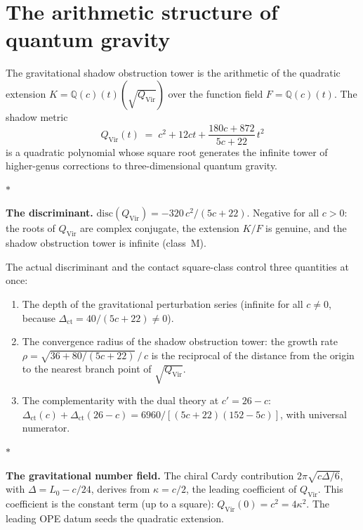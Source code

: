 \documentclass[11pt]{article}
\newcommand{\Q}{\mathbb{Q}}
\newcommand{\sep}{\bigskip\begin{center}$*$\end{center}\medskip}
\begin{document}
\section{The arithmetic structure of quantum gravity}
\label{sec:arithmetic-gravity}

The gravitational shadow obstruction tower is the arithmetic of the quadratic
extension $K = \Q(c)(t)(\sqrt{Q_{\mathrm{Vir}}})$ over the
function field $F = \Q(c)(t)$.  The shadow metric
\[
  Q_{\mathrm{Vir}}(t)
  \;=\;
  c^2 + 12ct + \frac{180c + 872}{5c + 22}\,t^2
\]
is a quadratic polynomial whose square root generates the
infinite tower of higher-genus corrections to three-dimensional
quantum gravity.

\sep

\noindent\textbf{The discriminant.}\enspace
$\mathrm{disc}(Q_{\mathrm{Vir}}) = -320\,c^2/(5c{+}22)$.
Negative for all $c > 0$: the roots of $Q_{\mathrm{Vir}}$
are complex conjugate, the extension $K/F$ is genuine, and
the shadow obstruction tower is infinite (class~M).

The actual discriminant and the contact square-class control three
quantities at once:
\begin{enumerate}[label=(\roman*),nosep]
\item The depth of the gravitational perturbation series
  (infinite for all $c \neq 0$, because
  $\Delta_{\mathrm{ct}} = 40/(5c{+}22) \neq 0$).
\item The convergence radius of the shadow obstruction tower: the growth
  rate $\rho = \sqrt{36 + 80/(5c{+}22)}\,/\,c$ is the reciprocal
  of the distance from the origin to the nearest branch point
  of $\sqrt{Q_{\mathrm{Vir}}}$.
\item The complementarity with the dual theory at $c' = 26 - c$:
  $\Delta_{\mathrm{ct}}(c) + \Delta_{\mathrm{ct}}(26{-}c)
  = 6960/[(5c{+}22)(152{-}5c)]$,
  with universal numerator.
\end{enumerate}

\sep

\noindent\textbf{The gravitational number field.}\enspace
The chiral Cardy contribution
$2\pi\sqrt{c\Delta/6}$, with $\Delta=L_0-c/24$,
derives from $\kappa = c/2$, the leading coefficient of
$Q_{\mathrm{Vir}}$.  This coefficient is the constant term
(up to a square): $Q_{\mathrm{Vir}}(0) = c^2 = 4\kappa^2$.
The leading OPE datum seeds the quadratic extension.
\end{document}

